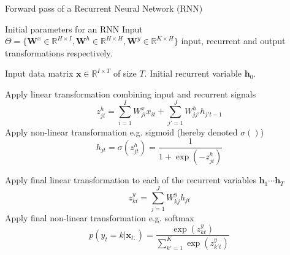 \begin{algorithm}[th!]
\label{algo:rnnforward}
   \caption{Forward pass of a Recurrent Neural Network (RNN)}
\begin{algorithmic}[1]

    Initial parameters for an RNN Input
$\Theta=\{\mathbf{W}^x \in \mathbb{R}^{H \times I}, \mathbf{W}^h \in \mathbb{R}^{H \times H}, \mathbf{W}^y \in \mathbb{R}^{K \times H} \}$ input, recurrent and output transformations respectively.

    Input data matrix $\mathbf{x} \in \mathbb{R}^{I \times T}$ of size $T$. Initial recurrent variable $\mathbf{h}_0$. 

     \STATE Apply linear transformation combining input and recurrent signals
        $$z_{jt}^h = \sum_{i=1}^{I} W_{ji}^x x_{it} + \sum_{j'=1}^{J} W_{jj'}^h h_{j't-1}$$
     \STATE Apply non-linear transformation e.g. sigmoid (hereby denoted $\sigma()$)
     $$h_{jt} = \sigma(z_{jt}^h)  = \frac{1}{1+\exp(-z_{jt}^h)}$$

	\ENDFOR

\STATE Apply final linear transformation to each of the recurrent variables $\mathbf{h}_1 \cdots \mathbf{h}_T$ 
   $$z_{kt}^y = \sum_{j=1}^{J} W_{kj}^y h_{jt}$$
\STATE Apply final non-linear transformation e.g. softmax 
$$p(y_t=k|\mathbf{x}_{t:}) = \frac{\exp(z_{kt}^y)}{\sum_{k'=1}^{K} \exp(z_{k't}^y)}$$

\end{algorithmic}
\end{algorithm}


